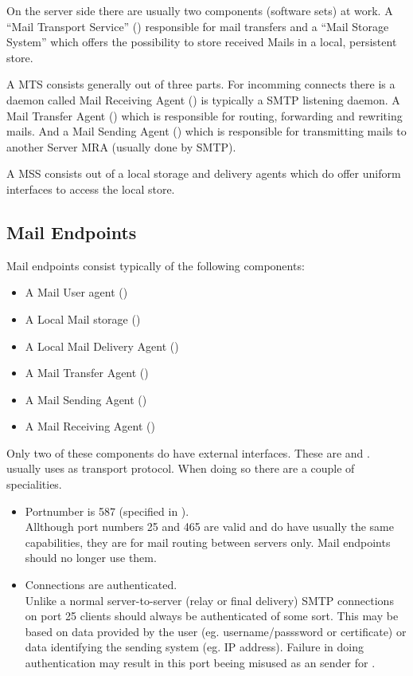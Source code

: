 On the server side there are usually two components (software sets) at work. A ``Mail Transport Service'' () responsible for mail transfers and a ``Mail Storage System'' which offers the possibility to store received Mails in a local, persistent store.\par

A MTS consists generally out of three parts. For incomming connects there is a daemon called Mail Receiving Agent () is typically a SMTP listening daemon. A Mail Transfer Agent () which is responsible for routing, forwarding and rewriting mails. And a Mail Sending Agent () which is responsible for transmitting mails to another Server MRA (usually done by SMTP).\par

A MSS consists out of a local storage and delivery agents which do offer uniform interfaces to access the local store.\par

\subsection{Mail Endpoints}
Mail endpoints consist typically of the following components:
\begin{itemize}
\item A Mail User agent ()
\item A Local Mail storage ()
\item A Local Mail Delivery Agent ()
\item A Mail Transfer Agent ()
\item A Mail Sending Agent ()
\item A Mail Receiving Agent ()
\end{itemize}

Only two of these components do have external interfaces. These are  and .  usually uses  as transport protocol. When doing so there are a couple of specialities. 
\begin{itemize}
\item Portnumber is 587 (specified in \cite{RFC4409}).\\
Allthough port numbers 25 and 465 are valid and do have usually the same capabilities, they are for mail routing between servers only. Mail endpoints should no longer use them.
\item Connections are authenticated.\\
Unlike a normal server-to-server (relay or final delivery) SMTP connections on port 25 clients should always be authenticated of some sort. This may be based on data provided by the user (eg. username/passsword or certificate) or data identifying the sending system (eg. IP address)\cite{RFC4409}. Failure in doing authentication may result in this port beeing misused as an sender for .
\end{itemize}

